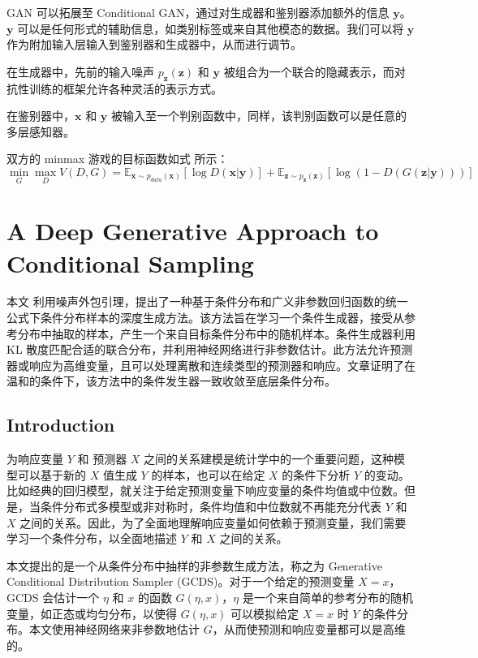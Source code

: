 \documentclass{myarticle}
\begin{document}
    GAN 可以拓展至 Conditional GAN，通过对生成器和鉴别器添加额外的信息 $\boldsymbol{y}$。$\boldsymbol{y}$ 可以是任何形式的辅助信息，如类别标签或来自其他模态的数据。我们可以将 $\boldsymbol{y}$ 作为附加输入层输入到鉴别器和生成器中，从而进行调节。

    在生成器中，先前的输入噪声 $p_{\boldsymbol{z}}(\boldsymbol{z})$ 和 $\boldsymbol{y}$ 被组合为一个联合的隐藏表示，而对抗性训练的框架允许各种灵活的表示方式。

    在鉴别器中，$\boldsymbol{x}$ 和 $\boldsymbol{y}$ 被输入至一个判别函数中，同样，该判别函数可以是任意的多层感知器。

    双方的 minmax 游戏的目标函数如式 所示：
    \begin{equation}
        \min_{G}\max_{D}V(D,G)=\mathbb{E}_{\boldsymbol{x}\sim p_{data}(\boldsymbol{x})}[\log D(\boldsymbol{x}|\boldsymbol{y})]+\mathbb{E}_{\boldsymbol{z}\sim p_{\boldsymbol{z}}(\boldsymbol{z})}[\log(1-D(G(\boldsymbol{z}|\boldsymbol{y})))]
        \label{cGAN objective function}
    \end{equation}

    \section{A Deep Generative Approach to Conditional Sampling}

    本文 \cite{Zhou_Jiao_2022} 利用噪声外包引理，提出了一种基于条件分布和广义非参数回归函数的统一公式下条件分布样本的深度生成方法。该方法旨在学习一个条件生成器，接受从参考分布中抽取的样本，产生一个来自目标条件分布中的随机样本。条件生成器利用 KL 散度匹配合适的联合分布，并利用神经网络进行非参数估计。此方法允许预测器或响应为高维变量，且可以处理离散和连续类型的预测器和响应。文章证明了在温和的条件下，该方法中的条件发生器一致收敛至底层条件分布。

    \subsection{Introduction}

    为响应变量 $Y$ 和 预测器 $X$ 之间的关系建模是统计学中的一个重要问题，这种模型可以基于新的 $X$ 值生成 $Y$ 的样本，也可以在给定 $X$ 的条件下分析 $Y$ 的变动。比如经典的回归模型，就关注于给定预测变量下响应变量的条件均值或中位数。但是，当条件分布式多模型或非对称时，条件均值和中位数就不再能充分代表 $Y$ 和 $X$ 之间的关系。因此，为了全面地理解响应变量如何依赖于预测变量，我们需要学习一个条件分布，以全面地描述 $Y$ 和 $X$ 之间的关系。

    本文提出的是一个从条件分布中抽样的非参数生成方法，称之为 Generative Conditional Distribution Sampler (GCDS)。对于一个给定的预测变量 $X=x$，GCDS 会估计一个 $\eta$ 和 $x$ 的函数 $G(\eta,x)$，$\eta$ 是一个来自简单的参考分布的随机变量，如正态或均匀分布，以使得 $G(\eta,x)$ 可以模拟给定 $X=x$ 时 $Y$ 的条件分布。本文使用神经网络来非参数地估计 $G$，从而使预测和响应变量都可以是高维的。
\end{document}
